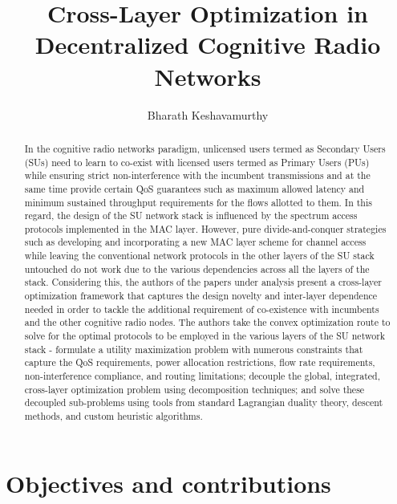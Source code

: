 \documentclass[12pt, draftcls, onecolumn]{IEEEtran}
\begin{document}
 
\title{Cross-Layer Optimization in Decentralized Cognitive Radio Networks}
\author{Bharath Keshavamurthy}
\maketitle
{}
\begin{abstract}
In the cognitive radio networks paradigm, unlicensed users termed as Secondary Users (SUs) need to learn to co-exist with licensed users termed as Primary Users (PUs) while ensuring strict non-interference with the incumbent transmissions and at the same time provide certain QoS guarantees such as maximum allowed latency and minimum sustained throughput requirements for the flows allotted to them. In this regard, the design of the SU network stack is influenced by the spectrum access protocols implemented in the MAC layer. However, pure divide-and-conquer strategies such as developing and incorporating a new MAC layer scheme for channel access while leaving the conventional network protocols in the other layers of the SU stack untouched do not work due to the various dependencies across all the layers of the stack. Considering this, the authors of the papers under analysis present a cross-layer optimization framework that captures the design novelty and inter-layer dependence needed in order to tackle the additional requirement of co-existence with incumbents and the other cognitive radio nodes. The authors take the convex optimization route to solve for the optimal protocols to be employed in the various layers of the SU network stack - formulate a utility maximization problem with numerous constraints that capture the QoS requirements, power allocation restrictions, flow rate requirements, non-interference compliance, and routing limitations; decouple the global, integrated, cross-layer optimization problem using decomposition techniques; and solve these decoupled sub-problems using tools from standard Lagrangian duality theory, descent methods, and custom heuristic algorithms.
\end{abstract}
\newpage
\section{Objectives and contributions}
\end{document}
